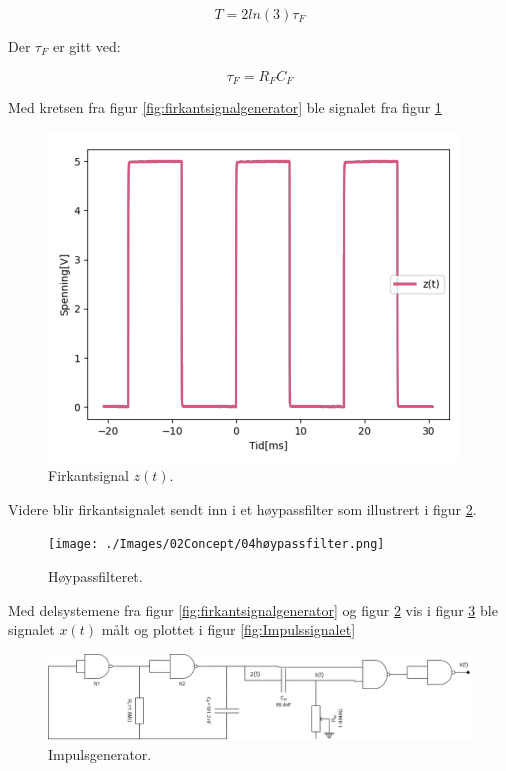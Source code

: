\begin{equation}
	T=2ln(3)\tau _F
	\label{eq:T}
\end{equation}

Der $\tau _F$ er gitt ved:

\begin{equation}
	\tau _F = R_F C_F 
	\label{eq:tau}
\end{equation}

Med kretsen fra figur \ref{fig:firkantsignalgenerator} ble signalet fra figur \ref{fig:firkantsignal}

\begin{figure}[!hbt]
	\centering
	\includegraphics[scale=0.4]{./Images/02Concept/03plotfirkant.png}
	\caption{Firkantsignal $z(t)$.}
    \label{fig:firkantsignal}
\end{figure}

Videre blir firkantsignalet sendt inn i et høypassfilter som illustrert i figur \ref{fig:høypassfilter}.

\begin{figure}[!hbt]
	\centering
	\texttt{[image: ./Images/02Concept/04høypassfilter.png]}
	\caption{Høypassfilteret.}
    \label{fig:høypassfilter}
\end{figure}

Med delsystemene fra figur \ref{fig:firkantsignalgenerator} og figur \ref{fig:høypassfilter} vis i figur \ref{fig:Impulsgenerator} ble signalet $x(t)$ målt og plottet i figur \ref{fig:Impulssignalet}

\begin{figure}[!hbt]
	\centering
	\includegraphics[scale=0.3]{./Images/02Concept/05begge.png}
	\caption{Impulsgenerator.}
    \label{fig:Impulsgenerator}
\end{figure}

